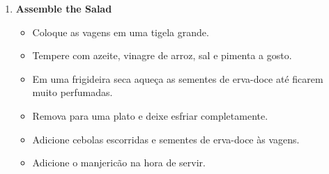 \documentclass [11pt, letterpaper] {article}
\begin{document}
\begin {description}
\begin {enumerate}
\item {\bf Assemble the Salad}
\begin {itemize}
\item Coloque as vagens em uma tigela grande.
\item Tempere com azeite, vinagre de arroz, sal e pimenta a gosto.
\item Em uma frigideira seca aqueça as sementes de erva-doce até ficarem muito perfumadas.
\item Remova para uma plato e deixe esfriar completamente.
\item Adicione cebolas escorridas e sementes de erva-doce \`as vagens.
\item Adicione o manjeric\~ao na hora de servir.
\end {itemize}
\end {enumerate}
\end {description}
\end{document}
